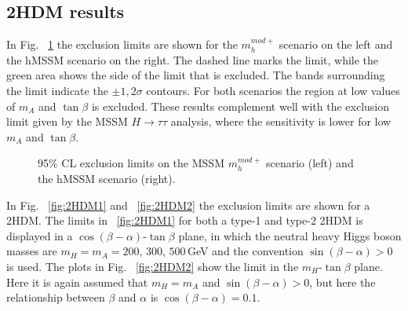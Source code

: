 \subsection*{2HDM results}
In Fig. ~\ref{fig:MSSM} the exclusion limits are shown for the $m_h^{mod+}$ scenario on the left and the hMSSM scenario on the right. The dashed line marks the limit, while the green area shows the side of the limit that is excluded. The bands surrounding the limit indicate the $\pm 1,2\sigma$ contours. For both scenarios the region at low values of $m_{A}$ and $\tan\beta$ is excluded. These results complement well with the exclusion limit given by the MSSM $H\rightarrow\tau\tau$ analysis, where the sensitivity is lower for low $m_{A}$ and $\tan\beta$.

\begin{figure}[htb]
\centering
{}

\caption{95$\%$ CL exclusion limits on the MSSM $m_h^{mod+}$ scenario (left) and the hMSSM scenario (right).}
    \label{fig:MSSM}
\end{figure}
In Fig. ~\ref{fig:2HDM1} and ~\ref{fig:2HDM2} the exclusion limits are shown for a 2HDM. The limits in ~\ref{fig:2HDM1} for both a type-1 and type-2 2HDM is displayed in a $\cos(\beta-\alpha)$-$\tan\beta$ plane, in which the neutral heavy Higgs boson masses are $m_{H}=m_{A}=200$, $300$, $500\,$GeV and the convention $\sin(\beta-\alpha) > 0$ is used. The plots in Fig. ~\ref{fig:2HDM2} show the limit in the $m_{H}$-$\tan\beta$ plane. Here it is again assumed that $m_{H}=m_{A}$ and $\sin(\beta-\alpha) > 0$, but here the relationship between $\beta$ and $\alpha$ is $\cos(\beta-\alpha)=0.1$. 

